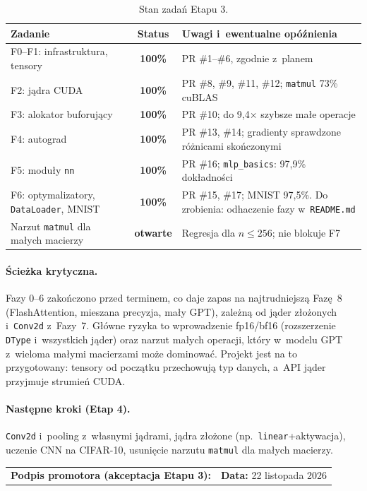 \documentclass[11pt,a4paper]{article}
\begin{document}
\begin{table}[H]
\centering
\caption{Stan zadań Etapu 3.}
\label{tab:schedule}
\begin{tabularx}{\textwidth}{@{}lcX@{}}
\toprule
\textbf{Zadanie} & \textbf{Status} & \textbf{Uwagi i~ewentualne opóźnienia} \\
\midrule
F0--F1: infrastruktura, tensory & \textbf{100\%} & PR \#1--\#6, zgodnie z~planem \\
F2: jądra CUDA & \textbf{100\%} & PR \#8, \#9, \#11, \#12; \texttt{matmul} 73\% cuBLAS \\
F3: alokator buforujący & \textbf{100\%} & PR \#10; do 9,4$\times$ szybsze małe operacje \\
F4: autograd & \textbf{100\%} & PR \#13, \#14; gradienty sprawdzone różnicami skończonymi \\
F5: moduły \texttt{nn} & \textbf{100\%} & PR \#16; \texttt{mlp\_basics}: 97,9\% dokładności \\
F6: optymalizatory, \texttt{DataLoader}, MNIST & \textbf{100\%} & PR \#15, \#17; MNIST
  97,5\%. Do zrobienia: odhaczenie fazy w~\texttt{README.md} \\
Narzut \texttt{matmul} dla małych macierzy & \textbf{otwarte} & Regresja dla
  $n \le 256$; nie blokuje F7 \\
\bottomrule
\end{tabularx}
\end{table}

\paragraph{Ścieżka krytyczna.} Fazy 0--6 zakończono przed terminem, co daje zapas na
najtrudniejszą Fazę~8 (FlashAttention, mieszana precyzja, mały GPT), zależną od jąder
złożonych i~\texttt{Conv2d} z~Fazy~7. Główne ryzyka to wprowadzenie fp16/bf16 (rozszerzenie
\texttt{DType} i~wszystkich jąder) oraz narzut małych operacji, który w~modelu GPT
z~wieloma małymi macierzami może dominować. Projekt jest na to przygotowany: tensory od
początku przechowują typ danych, a~API jąder przyjmuje strumień CUDA.

\paragraph{Następne kroki (Etap 4).} \texttt{Conv2d} i~pooling z~własnymi jądrami, jądra
złożone (np.\ \texttt{linear}+aktywacja), uczenie CNN na CIFAR-10, usunięcie narzutu
\texttt{matmul} dla małych macierzy.

\vfill
\noindent
\begin{tabularx}{\textwidth}{@{}Xr@{}}
\textbf{Podpis promotora (akceptacja Etapu 3):} \dotfill & \textbf{Data:} 22 listopada 2026 \\
\end{tabularx}
\end{document}
